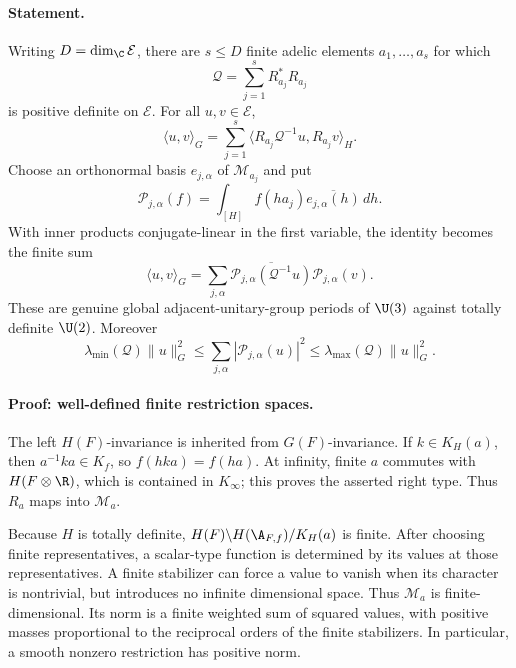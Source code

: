 \paragraph{Statement.}
Writing $D=\dim_\C\mathcal E$, there are $s\leq D$ finite adelic
elements $a_1,\ldots,a_s$ for which
\[
 \mathcal Q=\sum_{j=1}^sR_{a_j}^*R_{a_j}
\]
is positive definite on $\mathcal E$. For all $u,v\in\mathcal E$,
\begin{equation}\label{A5-frame}
 \langle u,v\rangle_G
  =\sum_{j=1}^s
          \langle R_{a_j}\mathcal Q^{-1}u,R_{a_j}v\rangle_H.
\end{equation}
Choose an orthonormal basis $e_{j,\alpha}$ of $\mathcal M_{a_j}$ and
put
\[
 \mathcal P_{j,\alpha}(f)=
    \int_{[H]}f(ha_j)\overline{e_{j,\alpha}(h)}\,dh.
\]
With inner products conjugate-linear in the first variable, the
identity becomes the finite sum
\begin{equation}\label{A5-periods}
 \langle u,v\rangle_G
  =\sum_{j,\alpha}
       \overline{\mathcal P_{j,\alpha}(\mathcal Q^{-1}u)}
                   \mathcal P_{j,\alpha}(v).
\end{equation}
These are genuine global adjacent-unitary-group periods of $\U(3)$
against totally definite $\U(2)$. Moreover
\begin{equation}\label{A5-bounds}
 \lambda_{\min}(\mathcal Q)\|u\|_G^2
 \leq\sum_{j,\alpha}|\mathcal P_{j,\alpha}(u)|^2
 \leq\lambda_{\max}(\mathcal Q)\|u\|_G^2.
\end{equation}

\paragraph{Proof: well-defined finite restriction spaces.}
The left $H(F)$-invariance is inherited from $G(F)$-invariance. If
$k\in K_H(a)$, then $a^{-1}ka\in K_f$, so
$f(hka)=f(ha)$. At infinity, finite $a$ commutes with $H(F\otimes\R)$,
which is contained in $K_\infty$; this proves the asserted right type.
Thus $R_a$ maps into $\mathcal M_a$.

Because $H$ is totally definite,
$H(F)\backslash H(\A_{F,f})/K_H(a)$ is finite. After choosing finite
representatives, a scalar-type function is determined by its values
at those representatives. A finite stabilizer can force a value to
vanish when its character is nontrivial, but introduces no infinite
dimensional space. Thus $\mathcal M_a$ is finite-dimensional. Its
norm is a finite weighted sum of squared values, with positive masses
proportional to the reciprocal orders of the finite stabilizers. In
particular, a smooth nonzero restriction has positive norm.

